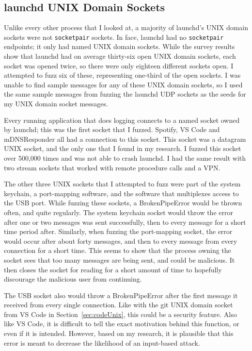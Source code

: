 \subsection{launchd UNIX Domain Sockets}
\label{sec:launchdUnix}
Unlike every other process that I looked at, a majority of launchd's UNIX domain sockets were not \texttt{socketpair} sockets.  In face, launchd had no \texttt{socketpair} endpoints; it only had named UNIX domain sockets.  While the survey results show that launchd had on average thirty-six open UNIX domain sockets, each socket was opened twice, so there were only eighteen different sockets open.  I attempted to fuzz six of these, representing one-third of the open sockets.  I was unable to find sample messages for any of these UNIX domain sockets, so I used the same sample messages from fuzzing the launchd UDP sockets as the seeds for my UNIX domain socket messages.

Every running application that does logging connects to a named socket owned by launchd; this was the first socket that I fuzzed.  Spotify, VS Code and mDNSResponder all had a connection to this socket.  This socket was a datagram UNIX socket, and the only one that I found in my research.  I fuzzed this socket over 500,000 times and was not able to crash launchd.  I had the same result with two stream sockets that worked with remote procedure calls and a VPN.

The other three UNIX sockets that I attempted to fuzz were part of the system keychain, a port-mapping software, and the software that multiplexes access to the USB port.  While fuzzing these sockets, a BrokenPipeError would be thrown often, and quite regularly.  The system keychain socket would throw the error after one or two messages was sent successfully, then to every message for a short time period after.  Similarly, when fuzzing the port-mapping socket, the error would occur after about forty messages, and then to every message from every connection for a short time.  This seems to show that the process owning the socket sees that too many messages are being sent, and could be malicious.  It then closes the socket for reading for a short amount of time to hopefully discourage the malicious user from continuing.

The USB socket also would throw a BrokenPipeError after the first message it received from every single connection.  Like with the git UNIX domain socket from VS Code in Section~\ref{sec:codeUnix}, this could be a security feature.  Also like VS Code, it is difficult to tell the exact motivation behind this function, or even if it is intended.  However, based on my research, it is plausible that this error is meant to decrease the likelihood of an input-based attack.

